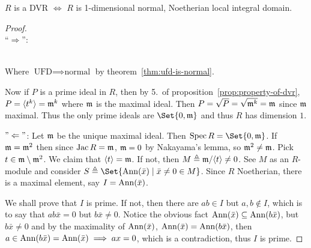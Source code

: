 \begin{prop} \label{dvr-equiv-condition}
  $R$ is a DVR $\iff$ $R$ is 1-dimensional normal, Noetherian local integral domain.
  \begin{proof} \hfill \\
    ``$\Rightarrow$'':
     \\
    Where $\text{UFD} \implies \text{normal}$ by theorem~\ref{thm:ufd-is-normal}.

    Now if $P$ is a prime ideal in $R$, then by 5.\ of proposition~\ref{prop:property-of-dvr},
    $P = \langle t^k\rangle = \mathfrak{m}^k$ where $\mathfrak{m}$ is the maximal ideal.
    Then $P = \sqrt{P} = \sqrt{\mathfrak{m}^k} = \mathfrak{m}$ since $\mathfrak{m}$ maximal. Thus the only
    prime ideals are $\Set{0, \mf}$ and thus $R$ has dimension $1$.

    $"\Leftarrow"$: Let $\mathfrak{m}$ be the unique maximal ideal.
    Then $\Spec R = \Set{0, \mf}$.
    If $\mathfrak{m} = \mathfrak{m}^2$ then since $\operatorname{Jac} R = \mathfrak{m}$, $\mathfrak{m} = 0$ by Nakayama's lemma,
    so $\mathfrak{m}^2 \neq \mathfrak{m}$. Pick $t \in \mathfrak{m} \setminus \mathfrak{m}^2$.
    We claim that $\langle t\rangle = \mathfrak{m}$. If not, then $M \triangleq \mathfrak{m} / \langle t\rangle \neq 0$.
    See $M$ as an $R$-module and consider $S \triangleq \Set{ \Ann(\bar{x}) \mid \bar{x} \neq 0 \in M }$.
    Since $R$ Noetherian, there is a maximal element, say $I = \operatorname{Ann}(\bar{x})$.

    We shall prove that $I$ is prime. If not, then there are $ab \in I$
    but $a, b \notin I$, which is to say that $ab\bar{x} = 0$ but $b \bar{x} \neq 0$.
    Notice the obvious fact $\operatorname{Ann}(\bar{x}) \subseteq \operatorname{Ann}(b\bar{x})$,
    but $b \bar{x} \ne 0$ and by the maximality of $\operatorname{Ann}(\bar{x})$,
    $\operatorname{Ann}(\bar{x}) = \operatorname{Ann}(b\bar{x})$, then $a \in \operatorname{Ann}(b\bar{x}) = \operatorname{Ann}(\bar{x})
    \implies ax = 0$, which is a contradiction, thus $I$ is prime.


\end{proof}
\end{prop}
